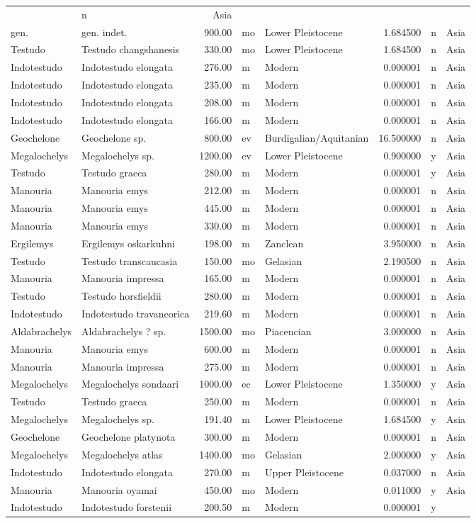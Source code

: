 \documentclass[]{article}
\begin{document}
\begin{longtable}[]{@{}llrllrll@{}}
& n & Asia\tabularnewline
gen. & gen. indet. & 900.00 & mo & Lower Pleistocene & 1.684500 & n &
Asia\tabularnewline
Testudo & Testudo changshanesis & 330.00 & mo & Lower Pleistocene &
1.684500 & n & Asia\tabularnewline
Indotestudo & Indotestudo elongata & 276.00 & m & Modern & 0.000001 & n
& Asia\tabularnewline
Indotestudo & Indotestudo elongata & 235.00 & m & Modern & 0.000001 & n
& Asia\tabularnewline
Indotestudo & Indotestudo elongata & 208.00 & m & Modern & 0.000001 & n
& Asia\tabularnewline
Indotestudo & Indotestudo elongata & 166.00 & m & Modern & 0.000001 & n
& Asia\tabularnewline
Geochelone & Geochelone sp. & 800.00 & ev & Burdigalian/Aquitanian &
16.500000 & n & Asia\tabularnewline
Megalochelys & Megalochelys sp. & 1200.00 & ev & Lower Pleistocene &
0.900000 & y & Asia\tabularnewline
Testudo & Testudo graeca & 280.00 & m & Modern & 0.000001 & y &
Asia\tabularnewline
Manouria & Manouria emys & 212.00 & m & Modern & 0.000001 & n &
Asia\tabularnewline
Manouria & Manouria emys & 445.00 & m & Modern & 0.000001 & n &
Asia\tabularnewline
Manouria & Manouria emys & 330.00 & m & Modern & 0.000001 & n &
Asia\tabularnewline
Ergilemys & Ergilemys oskarkuhni & 198.00 & m & Zanclean & 3.950000 & n
& Asia\tabularnewline
Testudo & Testudo transcaucasia & 150.00 & mo & Gelasian & 2.190500 & n
& Asia\tabularnewline
Manouria & Manouria impressa & 165.00 & m & Modern & 0.000001 & n &
Asia\tabularnewline
Testudo & Testudo horsfieldii & 280.00 & m & Modern & 0.000001 & n &
Asia\tabularnewline
Indotestudo & Indotestudo travancorica & 219.60 & m & Modern & 0.000001
& n & Asia\tabularnewline
Aldabrachelys & Aldabrachelys ? sp. & 1500.00 & mo & Piacencian &
3.000000 & n & Asia\tabularnewline
Manouria & Manouria emys & 600.00 & m & Modern & 0.000001 & n &
Asia\tabularnewline
Manouria & Manouria impressa & 275.00 & m & Modern & 0.000001 & n &
Asia\tabularnewline
Megalochelys & Megalochelys sondaari & 1000.00 & ec & Lower Pleistocene
& 1.350000 & y & Asia\tabularnewline
Testudo & Testudo graeca & 250.00 & m & Modern & 0.000001 & n &
Asia\tabularnewline
Megalochelys & Megalochelys sp. & 191.40 & m & Lower Pleistocene &
1.684500 & y & Asia\tabularnewline
Geochelone & Geochelone platynota & 300.00 & m & Modern & 0.000001 & n &
Asia\tabularnewline
Megalochelys & Megalochelys atlas & 1400.00 & mo & Gelasian & 2.000000 &
y & Asia\tabularnewline
Indotestudo & Indotestudo elongata & 270.00 & m & Upper Pleistocene &
0.037000 & n & Asia\tabularnewline
Manouria & Manouria oyamai & 450.00 & mo & Modern & 0.011000 & y &
Asia\tabularnewline
Indotestudo & Indotestudo forstenii & 200.50 & m & Modern & 0.000001 & y

\end{longtable}
\end{document}
